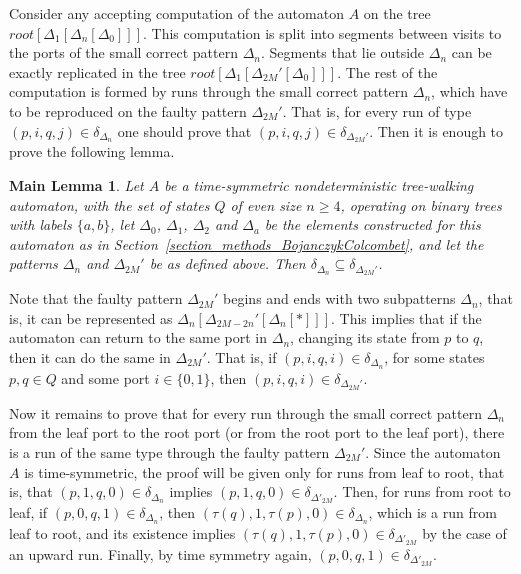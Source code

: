 \documentclass[12pt,a4paper]{article}
\newtheorem*{mainlemma}{Main Lemma}
\theoremstyle{definition}
\begin{document}
Consider any accepting computation of the automaton $A$
on the tree $\mathit{root}[\Delta_1[\Delta_n[\Delta_0]]]$.
This computation is split into segments between visits to the ports of the small correct pattern $\Delta_n$.
Segments that lie outside $\Delta_n$
can be exactly replicated in the tree $\mathit{root}[\Delta_1[\Delta_{2M}'[\Delta_0]]]$.
The rest of the computation is formed by runs through the small correct pattern $\Delta_n$,
which have to be reproduced on the faulty pattern $\Delta_{2M}'$.
That is, for every run of type $(p,i,q,j) \in \delta_{\Delta_n}$
one should prove that $(p,i,q,j) \in \delta_{\Delta_{2M}'}$.
Then it is enough to prove the following lemma.

\begin{mainlemma}
Let $A$ be a time-symmetric nondeterministic tree-walking automaton,
with the set of states $Q$ of even size $n \geqslant 4$,
operating on binary trees with labels $\{a,b\}$,
let $\Delta_0$, $\Delta_1$, $\Delta_2$ and $\Delta_a$
be the elements constructed for this automaton
as in Section~\ref{section_methods_BojanczykColcombet},
and let the patterns $\Delta_n$ and $\Delta_{2M}'$ be as defined above.
Then $\delta_{\Delta_n} \subseteq \delta_{\Delta_{2M}'}$.
\end{mainlemma}

Note that the faulty pattern $\Delta_{2M}'$ begins and ends with two subpatterns $\Delta_n$,
that is, it can be represented as $\Delta_n[\Delta_{2M-2n}'[\Delta_n[*]]]$.
This implies that if the automaton can return to the same port in $\Delta_n$,
changing its state from $p$ to $q$, then it can do the same in $\Delta_{2M}'$.
That is, if $(p,i,q,i) \in \delta_{\Delta_n}$, for some states $p,q \in Q$ and some port $i \in \{0, 1\}$,
then $(p,i,q,i) \in \delta_{\Delta_{2M}'}$.

Now it remains to prove that for every run through the small correct pattern $\Delta_n$
from the leaf port to the root port (or from the root port to the leaf port),
there is a run of the same type
through the faulty pattern $\Delta_{2M}'$.
Since the automaton $A$ is time-symmetric,
the proof will be given only for runs from leaf to root,
that is, that $(p,1,q,0) \in \delta_{\Delta_n}$ implies $(p,1,q,0) \in \delta_{\Delta'_{2M}}$.
Then, for runs from root to leaf, if $(p,0,q,1) \in \delta_{\Delta_n}$,
then $(\tau(q),1,\tau(p),0) \in \delta_{\Delta_n}$,
which is a run from leaf to root, and its existence implies
$(\tau(q),1,\tau(p),0) \in \delta_{\Delta'_{2M}}$
by the case of an upward run.
Finally, by time symmetry again, $(p,0,q,1) \in \delta_{\Delta'_{2M}}$.
\end{document}

